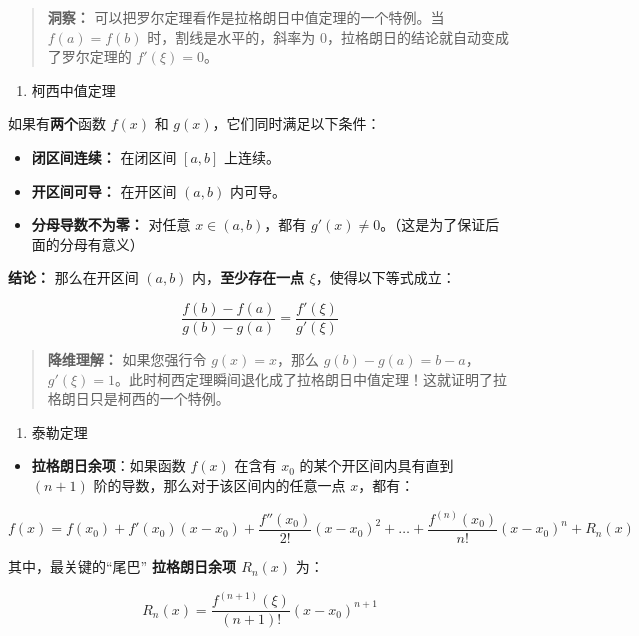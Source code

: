 \documentclass[
]{article}
\begin{document}
\begin{quote}
\textbf{洞察：} 可以把罗尔定理看作是拉格朗日中值定理的一个特例。当
\(f(a) = f(b)\) 时，割线是水平的，斜率为
0，拉格朗日的结论就自动变成了罗尔定理的 \(f'(\xi) = 0\)。
\end{quote}

\begin{enumerate}
\def\labelenumi{\arabic{enumi}.}
\item
  柯西中值定理
\end{enumerate}

如果有\textbf{两个}函数 \(f(x)\) 和 \(g(x)\)，它们同时满足以下条件：

\begin{itemize}
\item
  \textbf{闭区间连续：} 在闭区间 \([a, b]\) 上连续。
\item
  \textbf{开区间可导：} 在开区间 \((a, b)\) 内可导。
\item
  \textbf{分母导数不为零：} 对任意 \(x \in (a, b)\)，都有
  \(g'(x) \neq 0\)。（这是为了保证后面的分母有意义）
\end{itemize}

\textbf{结论：} 那么在开区间 \((a, b)\) 内，\textbf{至少存在一点
\(\xi\)}，使得以下等式成立：

\[\frac{f(b) - f(a)}{g(b) - g(a)} = \frac{f'(\xi)}{g'(\xi)}\]

\begin{quote}
\textbf{降维理解：} 如果您强行令 \(g(x) = x\)，那么
\(g(b) - g(a) = b - a\)，\(g'(\xi) = 1\)。此时柯西定理瞬间退化成了拉格朗日中值定理！这就证明了拉格朗日只是柯西的一个特例。
\end{quote}

\begin{enumerate}
\def\labelenumi{\arabic{enumi}.}
\item
  泰勒定理
\end{enumerate}

\begin{itemize}
\item
  \textbf{拉格朗日余项}：如果函数 \(f(x)\) 在含有 \(x_0\)
  的某个开区间内具有直到 \((n+1)\) 阶的导数，那么对于该区间内的任意一点
  \(x\)，都有：
\end{itemize}

\[f(x) = f(x_0) + f'(x_0)(x-x_0) + \frac{f''(x_0)}{2!}(x-x_0)^2 + \dots + \frac{f^{(n)}(x_0)}{n!}(x-x_0)^n + R_n(x)\]

其中，最关键的``尾巴'' \textbf{拉格朗日余项 \(R_n(x)\)} 为：

\[R_n(x) = \frac{f^{(n+1)}(\xi)}{(n+1)!}(x-x_0)^{n+1}\]
\end{document}
